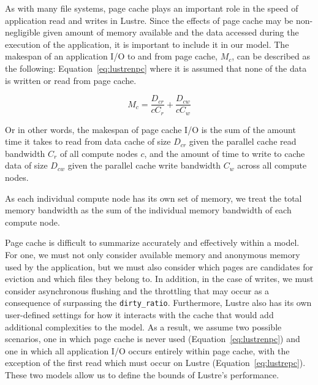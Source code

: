       As with many file systems, page cache plays an important role in the speed
      of application read and writes in Lustre. Since the effects of page cache
      may be non-negligible given amount of memory available and the data
      accessed during the execution of the application, it is important to
      include it in our model. The makespan of an application I/O to and from
      page cache, $M_{c}$, can be described as the following: Equation~\ref{eq:lustrenpc}
      where it is assumed that none of the data is written or read from page
      cache.


      \begin{equation}\label{eq:cache}
          M_{c} = \frac{D_{cr}}{cC_{r}} + \frac{D_{cw}}{cC_{w}}
      \end{equation}

      Or in other words, the makespan of page cache I/O is the sum of the amount
      time it takes to read from data cache of size $D_{cr}$ given the parallel
      cache read bandwidth $C_{r}$ of all compute nodes $c$, and the amount of
      time to write to cache data of size $D_{cw}$ given the parallel cache
      write bandwidth $C_{w}$ across all compute nodes.

    


       As each individual compute node has its own set of memory, we treat the
      total memory bandwidth as the sum of the individual memory bandwidth of
      each compute node.


      Page cache is difficult to summarize accurately and effectively within a
      model. For one, we must not only consider available memory and anonymous
      memory used by the application, but we must also consider which pages are
      candidates for eviction and which files they belong to. In addition, in
      the case of writes, we must consider asynchronous flushing and the
      throttling that may occur as a consequence of surpassing the
      \texttt{dirty\_ratio}. Furthermore, Lustre also has its own user-defined
      settings for how it interacts with the cache that would add additional
      complexities to the model. As a result, we assume two possible scenarios,
      one in which page cache is never used (Equation~\ref{eq:lustrenpc}) and
      one in which all application I/O occurs entirely within page cache, with the
      exception of the first read which must occur on Lustre
      (Equation~\ref{eq:lustrepc}). These two models allow us to define the
      bounds of Lustre's performance.

